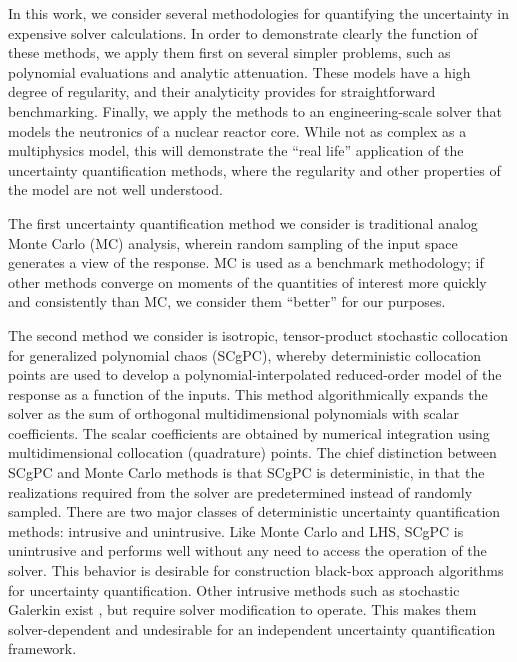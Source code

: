 In this work, we consider several methodologies for quantifying the uncertainty in expensive solver
calculations.  In order to demonstrate clearly the function of these methods, we apply them first on
several simpler problems, such as polynomial evaluations and analytic attenuation.  These models have a high
degree of regularity, and their analyticity provides for straightforward benchmarking.
Finally, we apply the methods to an engineering-scale solver that
models the neutronics of a nuclear reactor core.  While not as complex as a multiphysics model, this will
demonstrate the ``real life'' application of the uncertainty quantification methods, where the regularity and
other properties of the model are not well understood.

The first uncertainty quantification method we consider
is traditional analog Monte Carlo (MC) analysis, wherein random sampling of the input space generates a view of
the response.  MC is used as a benchmark methodology; if other methods converge on moments of the quantities
of interest more quickly and consistently than MC, we consider them ``better'' for our purposes.

The second method we consider is isotropic, tensor-product stochastic collocation for generalized polynomial
chaos (SCgPC)\cite{sparseSC,sparse1,sparse2,xiu}, whereby deterministic collocation points 
are used to develop a polynomial-interpolated reduced-order model
of the response as a function of the inputs.  This method algorithmically expands the solver as the sum of
orthogonal multidimensional polynomials with scalar coefficients.  The scalar coefficients are obtained by
numerical integration using multidimensional collocation (quadrature) points.  The chief distinction between
SCgPC and Monte Carlo methods is that SCgPC is deterministic, in that the realizations required from the
solver are predetermined instead of randomly sampled.  There are two major classes of deterministic
uncertainty quantification methods: intrusive and unintrusive.  Like Monte Carlo and LHS, SCgPC is unintrusive
and performs well without any need to access the operation of the solver.  This behavior is desirable for
construction black-box approach algorithms for uncertainty quantification.  Other intrusive methods such as
stochastic Galerkin exist \cite{galerkin}, but require solver modification to operate.  This makes them
solver-dependent and undesirable for an independent uncertainty quantification framework.

